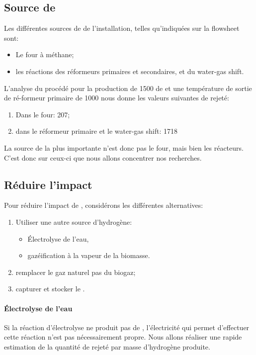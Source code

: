 \documentclass[10pt,a4paper]{report}
\begin{document}
\subsection{Source de }
Les différentes sources de  de l'installation, telles qu'indiquées sur la flowsheet sont:
\begin{itemize}
\item Le four à méthane;
\item les réactions des réformeurs primaires et secondaires, et du water-gas shift.
\end{itemize}
L'analyse du procédé pour la production de \unit{1500}{\tonne} de  et une température de sortie de ré-formeur primaire de \unit{1000}{\kelvin} nous donne les valeurs suivantes de  rejeté:
\begin{enumerate}
\item Dans le four: \unit{207}{\tonne};
\item dans le réformeur primaire et le water-gas shift: \unit{1718}{\tonne}
\end{enumerate}
La source de  la plus importante n'est donc pas le four, mais bien les réacteurs. C'est donc sur ceux-ci que nous allons concentrer nos recherches.
\subsection{Réduire l'impact}
Pour réduire l'impact de , considérons les différentes alternatives:
\begin{enumerate}
\item Utiliser une autre source d'hydrogène:
	\begin{itemize}
	\item Électrolyse de l'eau,
	\item gazéification  à la vapeur de la biomasse.
	\end{itemize}
\item remplacer le gaz naturel pas du biogaz;
\item capturer et stocker le .
\end{enumerate}
\paragraph{Électrolyse de l'eau}
Si la réaction d'électrolyse ne produit pas de , l'électricité qui permet d'effectuer cette réaction n'est pas nécessairement propre. Nous allons réaliser une rapide estimation de la quantité de  rejeté par masse d'hydrogène produite.
\end{document}
